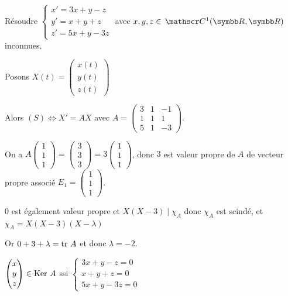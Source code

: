\begin{exemple}
    Résoudre $\begin{cases}
        x' = 3x + y - z \\
        y' = x + y + z \\
        z' = 5x + y - 3z
    \end{cases}$ avec $x, y, z \in \mc 1 (\R, \R)$ inconnues. 

    Posons $X(t) = \begin{pmatrix}
    x(t) \\ y(t) \\ z(t)
    \end{pmatrix}$

    Alors $(S) \Leftrightarrow X' = AX$ avec $A = \begin{pmatrix}
    3 & 1 & -1 \\
    1 & 1 & 1 \\
    5 & 1 & -3
    \end{pmatrix}$.

    On a $A \begin{pmatrix}
    1 \\ 1 \\ 1
    \end{pmatrix} = \begin{pmatrix}
    3 \\ 3 \\ 3
    \end{pmatrix} = 3 \begin{pmatrix}
    1 \\ 1 \\ 1
    \end{pmatrix}$, donc $3$ est valeur propre de $A$ de vecteur propre associé $E_1 = \begin{pmatrix}
    1 \\ 1 \\ 1
    \end{pmatrix}$.

    $0$ est également valeur propre et $X (X - 3) \mid \chi_A$ donc 
    $\chi_A$ est scindé, et $\chi_A = X (X - 3)(X - \lambda)$

    Or $0 + 3 + \lambda = \operatorname{tr} \, A$ et donc $\lambda = -2$. 

    $\begin{pmatrix}
        x \\ y \\ z
    \end{pmatrix} \in \operatorname{Ker} \, A$ ssi $\begin{cases}
        3x + y - z = 0 \\
        x + y + z = 0 \\
        5x + y - 3z = 0
    \end{cases}$


\end{exemple}
